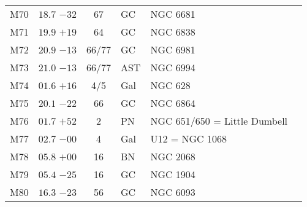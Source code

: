 \begin{table}[t]
\begin{tabular}{lcclll}
M70  &$18.7$ $-32$&67&GC &NGC 6681\\
M71  &$19.9$ $+19$&64&GC &NGC 6838\\
M72  &$20.9$ $-13$&66/77&GC &NGC 6981\\
M73  &$21.0$ $-13$&66/77&AST&NGC 6994\\
M74  &$01.6$ $+16$&4/5&Gal&NGC 628\\
M75  &$20.1$ $-22$&66&GC &NGC 6864\\
M76  &$01.7$ $+52$&2&PN &NGC 651/650 = Little Dumbell\\
M77  &$02.7$ $-00$&4&Gal&U12 = NGC 1068\\
M78  &$05.8$ $+00$&16&BN &NGC 2068\\
M79  &$05.4$ $-25$&16&GC &NGC 1904\\
M80  &$16.3$ $-23$&56&GC &NGC 6093\\
\hline
\end{tabular}
\end{table}


